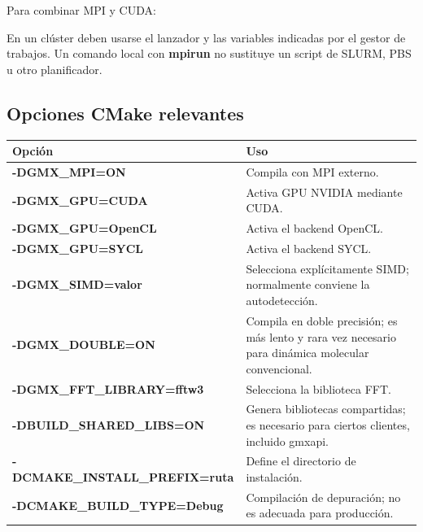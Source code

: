 \documentclass[
  spanish,
  11pt,
  a4paper]{article}
\newenvironment{Shaded}{\begin{snugshade}}{\end{snugshade}}
\newcommand{\AttributeTok}[1]{\textcolor[rgb]{0.13,0.29,0.53}{#1}}
\newcommand{\FunctionTok}[1]{\textcolor[rgb]{0.13,0.29,0.53}{\textbf{#1}}}
\newcommand{\NormalTok}[1]{#1}
\newcommand{\OperatorTok}[1]{\textcolor[rgb]{0.81,0.36,0.00}{\textbf{#1}}}
\newcommand{\StringTok}[1]{\textcolor[rgb]{0.31,0.60,0.02}{#1}}
\newcommand{\VariableTok}[1]{\textcolor[rgb]{0.00,0.00,0.00}{#1}}
\newcounter{none} %
\begin{document}
Para combinar MPI y CUDA:

\begin{Shaded}
\end{Shaded}

En un clúster deben usarse el lanzador y las variables indicadas por el
gestor de trabajos. Un comando local con \textbf{mpirun} no sustituye un
script de SLURM, PBS u otro planificador.

\subsection{Opciones CMake relevantes}\label{opciones-cmake-relevantes}

{\def\LTcaptype{none} %
\begin{longtable}[]{@{}
  >{\raggedright\arraybackslash}p{}
  >{\raggedright\arraybackslash}p{}@{}}
\toprule\noalign{}
\begin{minipage}[b]{\linewidth}\raggedright
Opción
\end{minipage} & \begin{minipage}[b]{\linewidth}\raggedright
Uso
\end{minipage} \\
\midrule\noalign{}
\endhead
\bottomrule\noalign{}
\endlastfoot
\textbf{-DGMX\_MPI=ON} & Compila con MPI externo. \\
\textbf{-DGMX\_GPU=CUDA} & Activa GPU NVIDIA mediante CUDA. \\
\textbf{-DGMX\_GPU=OpenCL} & Activa el backend OpenCL. \\
\textbf{-DGMX\_GPU=SYCL} & Activa el backend SYCL. \\
\textbf{-DGMX\_SIMD=valor} & Selecciona explícitamente SIMD; normalmente
conviene la autodetección. \\
\textbf{-DGMX\_DOUBLE=ON} & Compila en doble precisión; es más lento y
rara vez necesario para dinámica molecular convencional. \\
\textbf{-DGMX\_FFT\_LIBRARY=fftw3} & Selecciona la biblioteca FFT. \\
\textbf{-DBUILD\_SHARED\_LIBS=ON} & Genera bibliotecas compartidas; es
necesario para ciertos clientes, incluido gmxapi. \\
\textbf{-DCMAKE\_INSTALL\_PREFIX=ruta} & Define el directorio de
instalación. \\
\textbf{-DCMAKE\_BUILD\_TYPE=Debug} & Compilación de depuración; no es
adecuada para producción. \\
\end{longtable}
}
\end{document}
